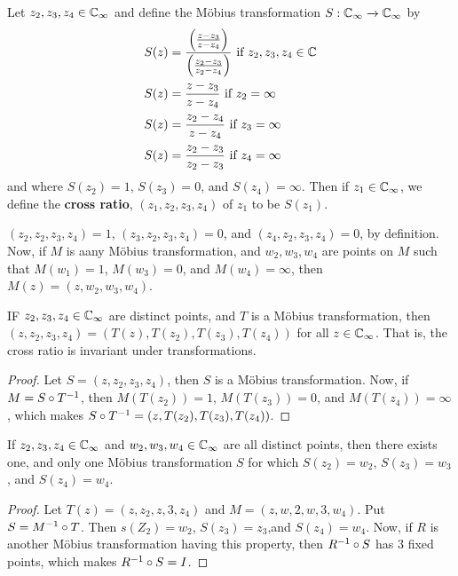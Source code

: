 \begin{definition}
    Let $z_2,z_3,z_4 \in \mathbb{C}_\infty$ and define the M\"obius transformation
    $S:\mathbb{C}_\infty \xrightarrow{} \mathbb{C}_\infty$ by
    \begin{align*}
        S(z)    &=  \frac{\Big{(} \frac{z-z_3}{z-z_4} \Big{)}}{\Big{(}
                        \frac{z_2-z_3}{z_2-z_4} \Big{)}} \text{ if } z_2,z_3,z_4
                                \in \mathbb{C}   \\
        S(z)    &= \frac{z-z_3}{z-z_4} \text{ if } z_2=\infty   \\
        S(z)    &= \frac{z_2-z_4}{z-z_4} \text{ if } z_3=\infty   \\
        S(z)    &= \frac{z_2-z_3}{z_2-z_3} \text{ if } z_4=\infty   \\
    \end{align*}
    and where $S(z_2)=1$, $S(z_3)=0$, and $S(z_4)=\infty$. Then if $z_1 \in
    \mathbb{C}_\infty$, we define the \textbf{cross ratio}, $(z_1,z_2,z_3,z_4)$ of $z_1$
    to be $S(z_1)$.
\end{definition}

\begin{example}\label{example_3.8}
    $(z_2,z_2,z_3,z_4)=1$, $(z_3,z_2,z_3,z_4)=0$, and $(z_4,z_2,z_3,z_4)=0$, by
    definition. Now, if $M$ is aany M\"obius transformation, and  $w_2,w_3,w_4$
    are points on $M$ such that $M(w_1)=1$, $M(w_3)=0$, and $M(w_4)=\infty$,
    then $M(z)=(z,w_2,w_3,w_4)$.
\end{example}

\begin{theorem}\label{3.3.5}
    IF $z_2,z_3,z_4 \in \mathbb{C}_\infty$ are distinct points, and $T$ is a M\"obius
    transformation, then  $(z,z_2,z_3,z_4)=(T(z),T(z_2),T(z_3),T(z_4))$ for all
    $z \in \mathbb{C}_\infty$. That is, the cross ratio is invariant under
    transformations.
\end{theorem}
\begin{proof}
    Let $S=(z,z_2,z_3,z_4)$, then $S$ is a M\"obius transformation. Now, if
    $M=S \circ T^{-1}$, then $M(T(z_2))=1$, $M(T(z_3))=0$, and
    $M(T(z_4))=\infty$, which makes $S \circ T^{-1}=(z,T(z_2),T(z_3),T(z_4))$.
\end{proof}

\begin{lemma}\label{3.3.6}
    If $z_2,z_3,z_4 \in \mathbb{C}_\infty$ and $w_2,w_3,w_4 \in \mathbb{C}_\infty$ are all
    distinct points, then there exists one, and only one M\"obius transformation
    $S$ for which $S(z_2)=w_2$, $S(z_3)=w_3$, and $S(z_4)=w_4$.
\end{lemma}
\begin{proof}
    Let $T(z)=(z,z_2,z,3,z_4)$ and $M=(z,w,2,w,3,w_4)$. Put $S=M^{-1} \circ T$.
    Then $s(Z_2)=w_2$, $S(z_3)=z_3$,and $S(z_4)=w_4$. Now, if $R$ is another
    M\"obius transformation having this property, then  $R^{-1} \circ S$ has
    $3$ fixed points, which makes $R^{-1} \circ S=I$.
\end{proof}

